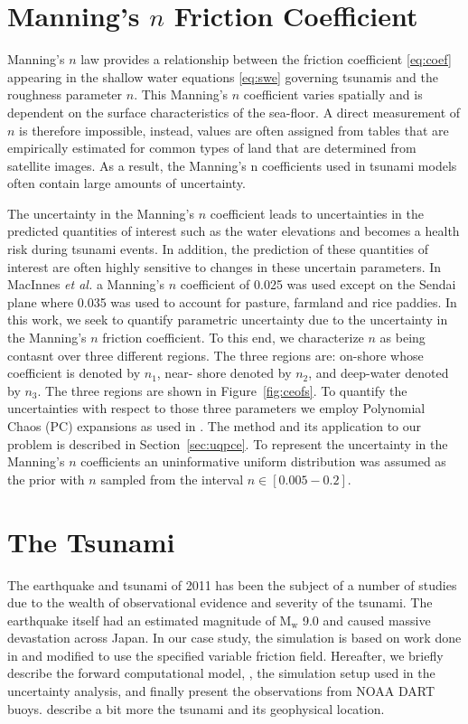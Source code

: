 \section{Manning’s $n$ Friction Coefficient} \label{sec:manning}

Manning's $n$ law provides a relationship between the friction coefficient
\eqref{eq:coef} appearing in the shallow water equations \eqref{eq:swe}
governing tsunamis and the roughness parameter $n$.  This Manning's $n$
coefficient varies spatially  and is dependent on the surface
characteristics of the sea-floor.  A direct measurement of $n$ is therefore
impossible, instead, values are often assigned from tables that are empirically
estimated for common types of land that are determined from satellite images. As
a result, the Manning’s n coefficients used in tsunami models often contain
large amounts of uncertainty.

The uncertainty in the Manning's $n$ coefficient leads to uncertainties in the
predicted quantities of interest such as the water elevations and becomes a
health risk during tsunami events. In addition,  the prediction of these
quantities of interest are often highly sensitive to changes in these
uncertain parameters.  In MacInnes \emph{et al.} a Manning's $n$ coefficient of 0.025
was used except on the Sendai plane where 0.035 was used to account for pasture,
farmland and rice paddies.  In this work, we seek to quantify parametric
uncertainty due to the uncertainty in the Manning's $n$ friction coefficient. To
this end, we characterize $n$ as being contasnt over three different 
regions. The three regions are:  on-shore whose coefficient is denoted by
$n_1$, near- shore  denoted by $n_2$, and deep-water denoted by $n_3$. The three
regions are shown in Figure~\ref{fig:ceofs}. To quantify the uncertainties
with respect to those three parameters we employ Polynomial Chaos (PC) expansions as used in
\cite{sraj:2013a,sraj:2013b}.  The method and its application to our problem is
described in Section~\ref{sec:uqpce}.  To represent the uncertainty in the
Manning's $n$ coefficients an uninformative uniform distribution was assumed as the prior with
$n$  sampled from the interval $n \in [0.005-0.2]$.

\section{The \tohoku Tsunami} 
\label{sec:tohoku}

The \tohoku earthquake and tsunami of 2011 has been the subject of a number of
studies due to the wealth of observational evidence and severity of the tsunami.
The earthquake itself had an estimated magnitude of $\text{M}_\text{w}$ 9.0 and
caused massive devastation across Japan.  In our case study, the
simulation is based on work done in \cite{MacInnes:2013cr} and modified to use
the specified variable friction field. Hereafter, we briefly describe the
forward computational model, \geoclaw, the  simulation setup used in the
uncertainty analysis, and finally present the observations from NOAA DART buoys.
\alert{describe a bit more the tsunami and its geophysical location}.
